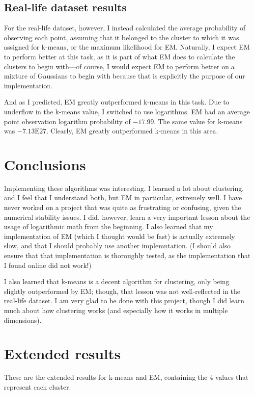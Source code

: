 \documentclass{journal}
\begin{document}
\subsection{Real-life dataset results}
For the real-life dataset, however, I instead calculated the average probability
of observing each point, assuming that it belonged to the cluster to which it
was assigned for k-means, or the maximum likelihood for EM. Naturally, I expect
EM to perform better at this task, as it is
part of what EM does to calculate the clusters to begin with---of course, I
would expect EM to perform better on a mixture of Gaussians to begin with
because that is explicitly the purpose of our implementation.

And as I predicted, EM greatly outperformed k-means in this task. Due to
underflow in the k-means value, I switched to use logarithms. EM had an average
point observation logarithm probability of $-17.99$. The same value for k-means
was $-7.13\mathrm{E}{27}$. Clearly, EM greatly outperformed k-means in this
area.

\section{Conclusions}
Implementing these algorithms was interesting. I learned a lot about clustering,
and I feel that I understand both, but EM in particular, extremely well. I have
never worked on a project that was quite as frustrating or confusing, given the
numerical stability issues. I did, however, learn a very important lesson about
the usage of logarithmic math from the beginning. I also learned that
my implementation of EM (which I thought would be fast) is actually extremely
slow, and that I should probably use another implemntation. (I should also
ensure that that implementation is thoroughly
tested, as the implementation that I found online did not work!)

I also learned that k-means is a decent algorithm for clustering, only being
slightly outperformed by EM; though,
that lesson was not well-reflected in the real-life dataset. I am very glad to
be done with this project, though I did learn much about how clustering
works (and especially how it works in multiple dimensions).

\clearpage{}
\appendix
\section{Extended results}\label{app:results}
These are the extended results for k-means and EM, containing the 4 values that
represent each cluster.
\end{document}

